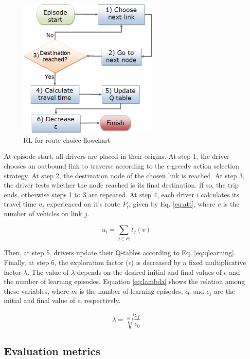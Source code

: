 \documentclass{RITA}
\newcommand{\route}[1]{\ensuremath{P_#1}}	%
\newcommand{\travTime}{\ensuremath{t_j}} 	%
\newcommand{\veh}{\ensuremath{v}}		%
\newcommand{\att}[1]{\ensuremath{u_#1}}		%
\begin{document}
\begin{figure}[ht]
    \centerline{\includegraphics[width=7cm]{img/flowchart3.png}}
    \caption{RL for route choice flowchart}
    \label{fig:flowchart}
\end{figure}

At episode start, all drivers are placed in their origins. At step 1, the driver chooses an outbound link to traverse according to the $\epsilon$-greedy action selection strategy. At step 2, the destination node of the chosen link is reached. At step 3, the driver tests whether the node reached is its final destination. If so, the trip ends, otherwise steps 1 to 3 are repeated. At step 4, each driver $i$ calculates its travel time $\att{i}$ experienced on it's route $\route{i}$, given by Eq. \eqref{eq:att}, where $\veh$ is the number of vehicles on link $j$.

\begin{equation}
\label{eq:att}
\att{i} = \sum_{j \in \route{i}} \travTime(\veh)
\end{equation}

Then, at step 5, drivers update their Q-tables according to Eq. \eqref{eq:qlearning}. Finally, at step 6, the exploration factor ($\epsilon$) is decreased by a fixed multiplicative factor $\lambda$. The value of $\lambda$ depends on the desired initial and final values of $\epsilon$ and the number of learning episodes. Equation \eqref{eq:lambda} shows the relation among these variables, where $m$ is the number of learning episodes, $\epsilon_0$ and $\epsilon_f$ are the initial and final value of $\epsilon$, respectively.

\begin{equation}
\label{eq:lambda}
\lambda = \sqrt[m]{\frac{\epsilon_f}{\epsilon_0}}
\end{equation}

\subsection{Evaluation metrics}
\end{document}
